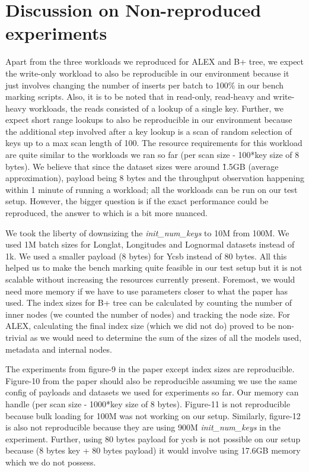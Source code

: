 \documentclass[12pt,a4paper]{article}
\begin{document}
\section{Discussion on Non-reproduced experiments}
Apart from the three workloads we reproduced for ALEX and B+ tree, we expect the write-only workload to also be reproducible in our environment because it just involves changing the number of inserts per batch to 100\% in our bench marking scripts. Also, it is to be noted that in read-only, read-heavy and write-heavy workloads, the reads consisted of a lookup of a single key. Further, we expect short range lookups to also be reproducible in our environment because the additional step involved after a key lookup is a scan of random selection of keys up to a max scan length of 100. The resource requirements for this workload are quite similar to the workloads we ran so far (per scan size - 100*key size of 8 bytes). We believe that since the dataset sizes were around \~1.5GB (average approximation), payload being 8 bytes and the throughput observation happening within 1 minute of running a workload; all the workloads can be run on our test setup. However, the bigger question is if the exact performance could be reproduced, the answer to which is a bit more nuanced.

We took the liberty of downsizing the \emph{init\_num\_keys} to 10M from 100M. We used 1M batch sizes for Longlat, Longitudes and Lognormal datasets instead of 1k. We used a smaller payload (8 bytes) for Ycsb instead of 80 bytes. All this helped us to make the bench marking quite feasible in our test setup but it is not scalable without increasing the resources currently present. Foremost, we would need more memory if we have to use parameters closer to what the paper has used. The index sizes for B+ tree can be calculated by counting the number of inner nodes (we counted the number of nodes) and tracking the node size. For ALEX, calculating the final index size (which we did not do) proved to be non-trivial as we would need to determine the sum of the sizes of all the models used, metadata and internal nodes. 

The experiments from figure-9 in the paper except index sizes are reproducible. Figure-10 from the paper should also be reproducible assuming we use the same config of payloads and datasets we used for experiments so far. Our memory can handle (per scan size - 1000*key size of 8 bytes). Figure-11 is not reproducible because bulk loading for 100M was not working on our setup. Similarly, figure-12 is also not reproducible because they are using 900M \emph{init\_num\_keys} in the experiment. Further, using 80 bytes payload for ycsb is not possible on our setup because (8 bytes key + 80 bytes payload) it would involve using 17.6GB memory which we do not possess.



\newpage

\end{document}
